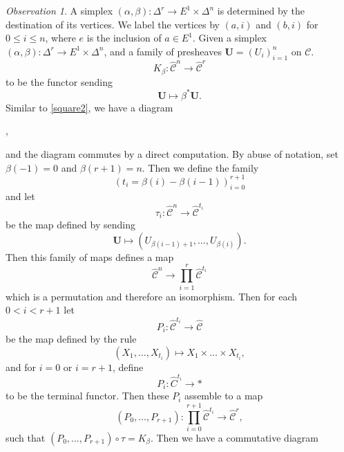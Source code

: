 \documentclass[leqno]{article}
\numberwithin{equation}{subsection}
\theoremstyle{plain}   %
\theoremstyle{remark}
\newtheorem{obs}[equation]{Observation}
\theoremstyle{plain}
\DeclareMathOperator{\id}{id}
\newcommand{\overcat}[2]{{\left(#1\downarrow #2\right)}}
\newcommand{\psh}[1]{\ensuremath{\widehat{#1}}}
\providecommand{\C}{}
\renewcommand{\C}{\ensuremath{\mathcal{C}}}
\newcommand{\ssetlab}{\ensuremath{\widehat{\Delta} \int \widehat{\mathcal{C}}}}
\begin{document}
\begin{obs}\label{joyalsquare2}
	A simplex \((\alpha,\beta):\Delta^r \to E^1\times \Delta^n\) is determined by the destination of its vertices.  We label the vertices by \((a,i)\) and \((b,i)\) for \(0\leq i \leq n\), where \(e\) is the inclusion of \(a \in E^1\).  Given a simplex \((\alpha,\beta):\Delta^r\to E^1\times \Delta^n\), and a family of presheaves \(\mathbf{U}=(U_i)_{i=1}^n\) on \(\C\). 
	\[K_{\beta}:\psh{\C}^n \to \psh{\C}^r\]
	to be the functor sending
	\[\mathbf{U} \mapsto \beta^\ast \mathbf{U}.\]
	Similar to \ref{square2}, we have a diagram
	\begin{center}
		,
	\end{center}
	and the diagram commutes by a direct computation.  
	By abuse of notation, set \(\beta(-1)=0\) and \(\beta(r+1)=n\).  Then we define the family
	\[(t_i=\beta(i) - \beta(i-1))_{i=0}^{r+1}\] and let 
	\[\tau_i:\psh{\C}^n \to \psh{\C}^{t_i}\]
	be the map defined by sending 
	\[\mathbf{U}\mapsto (U_{\beta(i-1)+1},\dots,U_{\beta(i)}).\]
	Then this family of maps defines a map 
	\[\psh{\C}^n \to \prod_{i=1}^r\psh{\C}^{t_i}\]
	which is a permutation and therefore an isomorphism. Then for each \(0<i<r+1\) let
	\[P_i:\psh{\C}^{t_i} \to \psh{\C}\]
	be the map defined by the rule 
	\[(X_1,\dots,X_{t_i})\mapsto X_1\times \dots \times X_{t_i},\]
	and for \(i=0\) or \(i=r+1\), define 
	\[P_i:\psh{C}^{t_i} \to \ast\]
	to be the terminal functor.
	Then these \(P_i\) assemble to a map 
	\[(P_0,\dots,P_{r+1}): \prod_{i=0}^{r+1} \psh{\C}^{t_i} \to \psh{\C}^r,\]
	such that \((P_0,\dots,P_{r+1})\circ \tau = K_\beta\).
	Then we have a commutative diagram
	\begin{center}
\end{center}
\end{obs}
\end{document}
